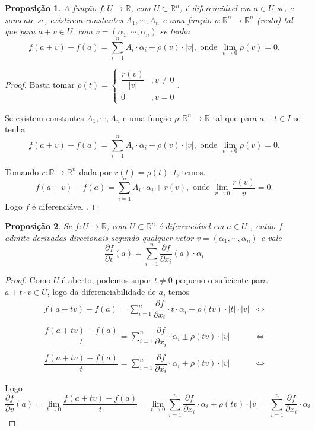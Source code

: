 \documentclass{article}
\newtheorem{prop}{Proposição}[section]
\theoremstyle{theorem}
\theoremstyle{lemma}
\theoremstyle{definition}
\theoremstyle{remark}
\begin{document}
   \begin{prop}
	   A função \( f:U\to \mathbb{R} \), com \(U \subset \mathbb{R}^n \),   é diferenciável em \(a\in U\) se, e somente se,  existirem constantes \( A_1,\cdots, A_n\)  e uma função \(\rho : \mathbb{R}^n \to \mathbb{R}^n\) (resto) tal que para \(a+v\in U\), com \( v = (\alpha_1, \cdots , \alpha_n ) \)  se tenha \[ f(a+v) - f(a) = \sum_{i=1}^n A_i \cdot \alpha_i  + \rho(v)\cdot |v|, \text{ onde } \lim_{v \to 0} \rho(v) = 0.\]
   \end{prop}
   \begin{proof}
	   Basta tomar \(\rho(t) = \begin{cases} \dfrac{r(v)}{|v|} &, v\neq 0 \\ 0 &, v=0 \end{cases} \).

		   Se existem constantes \( A_1,\cdots, A_n \)  e uma função $\rho : \mathbb{R}^n \to \mathbb{R}$  tal que para \(a+t\in I\) se tenha 
\[ f(a+v) - f(a) = \sum_{i=1}^n A_i \cdot \alpha_i  + \rho(v)\cdot |v|, \text{ onde } \lim_{v \to 0} \rho(v) = 0.\]

	   Tomando \( r: \mathbb{R} \to \mathbb{R}^n \) dada por \( r(t) = \rho(t)\cdot t \), temos.
	   \[ f(a+v) - f(a) = \sum_{i=1}^n A_i \cdot \alpha_i  + r(v), \text{ onde } \lim_{v \to 0} \dfrac{r(v)}{v} = 0.\]
	   Logo \(f\) é diferenciável .
   \end{proof}
   \begin{prop}
	   Se \(f:U\to \mathbb{R}\), com \( U \subset \mathbb{R}^n \) é diferenciável em \( a\in U \) , então \(f\) admite derivadas direcionais segundo qualquer vetor \( v = (\alpha_1,\cdots, \alpha_n) \) e vale \[ \dfrac{\partial f}{\partial v}(a) = \displaystyle\sum_{i = 1}^n \dfrac{\partial f}{\partial x_i}(a) \cdot \alpha_i \]
   \end{prop}
   \begin{proof}
	   Como \( U \) é aberto, podemos supor \(t\neq 0 \) pequeno o suficiente para \( a+ t\cdot v\in U\), logo
	   da diferenciabilidade de \(a\), temos 
	  \begin{align*}
		  f(a+tv) - f(a) = \sum_{i = 1}^n \dfrac{\partial f}{\partial x_i}\cdot t\cdot \alpha_i + \rho(tv) \cdot |t|\cdot |v| &\iff\\~\\
		  \dfrac{f(a+tv) - f(a)}{t} = \sum_{i = 1}^n \dfrac{\partial f}{\partial x_i}\cdot \alpha_i \pm \rho(tv) \cdot |v| &\iff\\~\\
		  \dfrac{f(a+tv) - f(a)}{t} = \sum_{i = 1}^n \dfrac{\partial f}{\partial x_i}\cdot \alpha_i \pm \rho(tv) \cdot |v| &\iff\\~\\
	  \end{align*}
	  Logo 
	   \[ 
		  \dfrac{\partial f}{\partial v}(a) = \lim_{t\to 0}\dfrac{f(a+tv) - f(a)}{t} = \lim_{t\to 0} \sum_{i = 1}^n \dfrac{\partial f}{\partial x_i}\cdot \alpha_i \pm \rho(tv) \cdot |v| = \sum_{i = 1}^n \dfrac{\partial f}{\partial x_i}\cdot \alpha_i
		  \]
   \end{proof}
\end{document}
